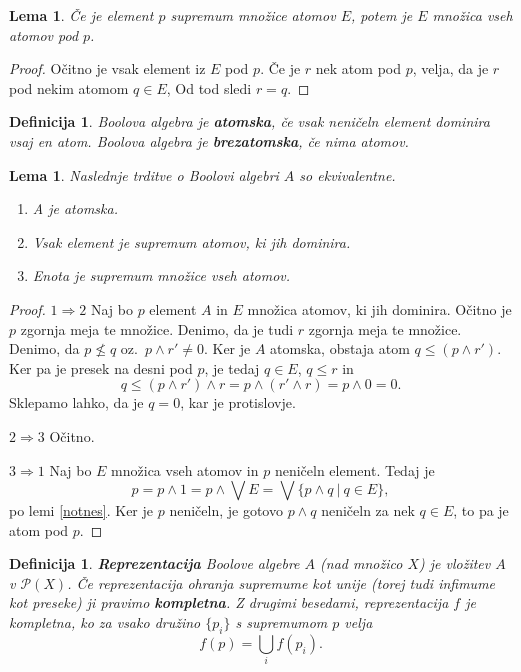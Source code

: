 \documentclass{amsart}
\newtheorem{lema}[izrek]{Lema}
\newtheorem{definicija}[izrek]{Definicija}
\begin{document}
\begin{lema}
    Če je element \(p\) supremum množice atomov \(E\), potem je \(E\) množica vseh atomov pod \(p\).
\end{lema}

\begin{proof}
    Očitno je vsak element iz $E$ pod $p$. 
    Če je $r$ nek atom pod $p$, velja, da je $r$ pod nekim atomom \(q \in E\),
    Od tod sledi $r = q$.
\end{proof}


\begin{definicija}
    Boolova algebra je \textbf{atomska}, če vsak neničeln element dominira vsaj en atom. 
    Boolova algebra je \textbf{brezatomska}, če nima atomov.
\end{definicija}

\begin{lema}
    Naslednje trditve o Boolovi algebri \(A\) so ekvivalentne.
    \begin{enumerate}
        \item A je atomska.
        \item Vsak element je supremum atomov, ki jih dominira.
        \item Enota je supremum množice vseh atomov.
    \end{enumerate}
\end{lema}

\begin{proof}
    \(1 \Rightarrow 2\) Naj bo $p$ element $A$ in $E$ množica atomov, ki 
    jih dominira. Očitno je $p$ zgornja meja te množice. Denimo, da je tudi $r$ 
    zgornja meja te množice. Denimo, da \(p \nleq q\) oz.~\(p \wedge  r' \neq 0\).
    Ker je $A$ atomska, obstaja atom \(q \leq (p \wedge r')\). Ker pa je presek 
    na desni pod $p$, je tedaj $q \in E$, $q \leq r$ in
    \[q \leq (p \wedge r') \wedge r = p \wedge (r' \wedge r) = p \wedge 0 = 0.\]
    Sklepamo lahko, da je $q = 0$, kar je protislovje.

    \(2 \Rightarrow 3\) Očitno. 


    \(3 \Rightarrow 1\) Naj bo \(E\) množica vseh atomov in $p$ neničeln element.
    Tedaj je 
    \[p = p \wedge 1 = p \wedge \bigvee E = \bigvee \{p \wedge q~|~q\in E\},\]
    po lemi \ref*{notnes}. Ker je $p$ neničeln, je gotovo \(p \wedge q\) neničeln 
    za nek \(q \in E\), to pa je atom pod \(p\).
\end{proof}

\begin{definicija}
    \textbf{Reprezentacija} Boolove algebre $A$ (nad množico $X$) je vložitev $A$
    v \(\mathcal{P}(X)\). Če reprezentacija ohranja supremume kot unije
    (torej tudi infimume kot preseke) ji pravimo \textbf{kompletna}. Z drugimi besedami, 
    reprezentacija $f$ je kompletna, ko za vsako družino \(\{p_i\}\)
    s supremumom \(p\) velja 
    \[f(p) = \bigcup_i f(p_i).\]
\end{definicija}
\end{document}

